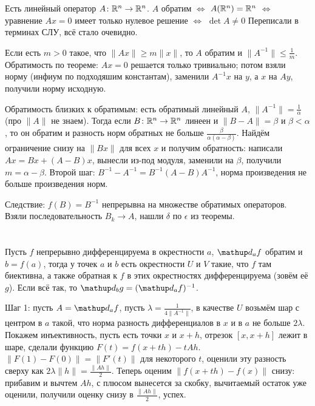 \section{} %
Есть линейный оператор $A \colon \mathbb{R}^n \to \mathbb{R}^n$.
$A$ обратим $\iff$ $A(\mathbb{R}^n)=\mathbb{R}^n$ $\iff$ уравнение $Ax=0$ имеет только нулевое решение $\iff$ $\det A \neq 0$
Переписали в терминах СЛУ, всё стало очевидно.

Если есть $m>0$ такое, что $\|Ax\| \ge m\|x\|$, то $A$ обратим и $\|A^{-1}\| \le \frac 1m$.
Обратимость по теореме: $Ax=0$ решается только тривиально; потом взяли норму (инфиум по подходяшим константам), заменили $A^{-1}x$ на $y$, а $x$ на $Ay$, получили норму исходную.

Обратимость близких к обратимым: есть обратимый линейный $A$, $\|A^{-1}\|=\frac 1 \alpha$ (про $\|A\|$ не знаем).
Тогда если $B \colon \mathbb{R}^n \to \mathbb{R}^n$ линеен и $\|B-A\| = \beta$ и $\beta < \alpha$, то он обратим и разность норм обратных не больше $\frac{\beta}{\alpha(\alpha-\beta)}$.
Найдём ограничение снизу на $\|Bx\|$ для всех $x$ и получим обратность: написали $Ax=Bx+(A-B)x$, вынесли из-под модуля, заменили на $\beta$, получили $m=\alpha-\beta$.
Второй шаг: $B^{-1}-A^{-1}=B^{-1}(A-B)A^{-1}$, норма произведения не больше произведения норм.

Следствие: $f(B)=B^{-1}$ непрерывна на множестве обратимых операторов.
Взяли последовательность $B_k \to A$, нашли $\delta$ по $\epsilon$ из теоремы.

\section{} %
Пусть $f$ непрерывно дифференцируема в окрестности $a$, $\d_af$ обратим и $b=f(a)$, тогда
у точек $a$ и $b$ есть окрестности $U$ и $V$ такие, что $f$ там биективна,
а также обратная к $f$ в этих окрестностях дифференцируема (зовём её $g$).
Если всё так, то $\d_b g = (\d_a f)^{-1}$.

Шаг 1: пусть $A=\d_a f$, пусть $\lambda = \frac{1}{4\|A^{-1}\|}$, в качестве $U$ возьмём шар с центром в $a$ такой, что норма разность дифференциалов в $x$ и в $a$ не больше $2\lambda$.
Покажем инъективность, пусть есть точки $x$ и $x+h$, отрезок $[x,x+h]$ лежит в шаре, сделали функцию $F(t)=f(x+th)-tAh$.
$\|F(1)-F(0)\|=\|F'(t)\|$ для некоторого $t$, оценили эту разность сверху как $2\lambda \|h\| = \frac{\|Ah\|}{2}$.
Теперь оценим $\|f(x+th)-f(x)\|$ снизу: прибавим и вычтем $Ah$, с плюсом вынесется за скобку, вычитаемый остаток уже оценили, получили оценку снизу в $\frac{\|Ah\|}{2}$, успех.

